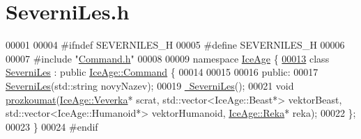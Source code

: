 \hypertarget{SeverniLes_8h_source}{}\section{Severni\+Les.\+h}
\label{SeverniLes_8h_source}

\begin{DoxyCode}
00001 
00004 \textcolor{preprocessor}{#ifndef SEVERNILES\_H}
00005 \textcolor{preprocessor}{#define SEVERNILES\_H}
00006 
00007 \textcolor{preprocessor}{#include "\hyperlink{Command_8h}{Command.h}"}
00008 
00009 \textcolor{keyword}{namespace }\hyperlink{namespaceIceAge}{IceAge} \{
\hypertarget{SeverniLes_8h_source.tex_l00013}{}\hyperlink{classIceAge_1_1SeverniLes}{00013}     \textcolor{keyword}{class }\hyperlink{classIceAge_1_1SeverniLes}{SeverniLes} : \textcolor{keyword}{public} \hyperlink{classIceAge_1_1Command}{IceAge::Command} \{
00014 
00015 
00016     \textcolor{keyword}{public}:
00017         \hyperlink{classIceAge_1_1SeverniLes_accad5e1d48610aabeef941f2ba182832}{SeverniLes}(std::string novyNazev);
00019         \hyperlink{classIceAge_1_1SeverniLes_abfc44ad357a1eeb29a0aead797dfe6b8}{~SeverniLes}();
00021         \textcolor{keywordtype}{void} \hyperlink{classIceAge_1_1SeverniLes_a59fd82f865c7b89988752f16b0e10322}{prozkoumat}(\hyperlink{classIceAge_1_1Veverka}{IceAge::Veverka}* scrat, std::vector<IceAge::Beast*> 
      vektorBeast, std::vector<IceAge::Humanoid*> vektorHumanoid, \hyperlink{classIceAge_1_1Reka}{IceAge::Reka}* reka);
00022     \};
00023 \}
00024 \textcolor{preprocessor}{#endif}
\end{DoxyCode}

